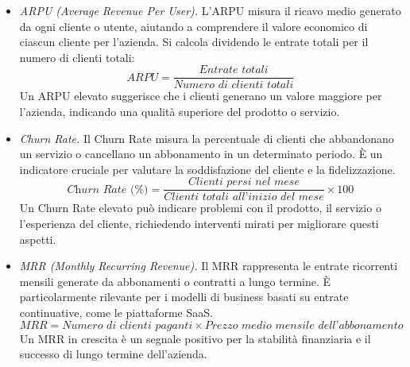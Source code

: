 \begin{itemize}
    \item \textit{ARPU (Average Revenue Per User).} L’ARPU misura il ricavo medio generato da ogni cliente o utente, aiutando a comprendere il valore economico di ciascun cliente per l’azienda. Si calcola dividendo le entrate totali per il numero di clienti totali:
    \begin{equation*}
        \textit{ARPU} = \frac{\textit{Entrate totali}}{\textit{Numero di clienti totali}}
    \end{equation*}
    Un ARPU elevato suggerisce che i clienti generano un valore maggiore per l’azienda, indicando una qualità superiore del prodotto o servizio.
    \item \textit{Churn Rate.} Il Churn Rate misura la percentuale di clienti che abbandonano un servizio o cancellano un abbonamento in un determinato periodo. È un indicatore cruciale per valutare la soddisfazione del cliente e la fidelizzazione.
    \begin{equation*}
    \textit{Churn Rate (\%)} = \frac{\textit{Clienti persi nel mese}}{\textit{Clienti totali all’inizio del mese}}\times 100
    \end{equation*}
    Un Churn Rate elevato può indicare problemi con il prodotto, il servizio o l’esperienza del cliente, richiedendo interventi mirati per migliorare questi aspetti.
    \item \textit{MRR (Monthly Recurring Revenue).} Il MRR rappresenta le entrate ricorrenti mensili generate da abbonamenti o contratti a lungo termine. È particolarmente rilevante per i modelli di business basati su entrate continuative, come le piattaforme SaaS.
    \begin{equation*}
    \textit{MRR}=\textit{Numero di clienti paganti}\times\textit{Prezzo medio mensile dell’abbonamento}   
    \end{equation*}
    Un MRR in crescita è un segnale positivo per la stabilità finanziaria e il successo di lungo termine dell’azienda.
\end{itemize}

